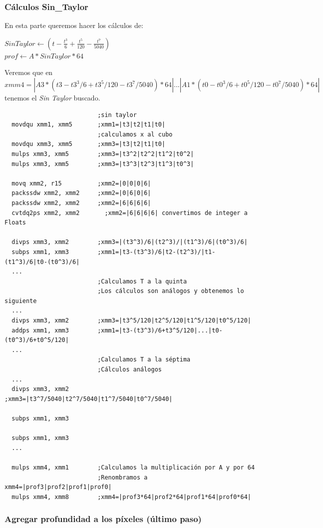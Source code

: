 \subsubsection*{Cálculos Sin_Taylor}
En esta parte queremos hacer los cálculos de:
\begin{center}
	$SinTaylor \gets (t - \frac{t^3}{6}+\frac{t^5}{120}-\frac{t^7}{5040})$ \\
	$prof \gets A * SinTaylor*64$
\end{center}
Veremos que en $xmm4=|A3*(t3-t3^3/6+t3^5/120-t3^7/5040)*64|...|A1*(t0-t0^3/6+t0^5/120-t0^7/5040)*64|$ tenemos el \textit{Sin Taylor} buscado.
\begin{codesnippet}
\begin{verbatim}
                          ;sin taylor
  movdqu xmm1, xmm5       ;xmm1=|t3|t2|t1|t0|
                          ;calculamos x al cubo
  movdqu xmm3, xmm5       ;xmm3=|t3|t2|t1|t0|
  mulps xmm3, xmm5        ;xmm3=|t3^2|t2^2|t1^2|t0^2|
  mulps xmm3, xmm5        ;xmm3=|t3^3|t2^3|t1^3|t0^3|	

  movq xmm2, r15          ;xmm2=|0|0|0|6|
  packssdw xmm2, xmm2     ;xmm2=|0|6|0|6|
  packssdw xmm2, xmm2     ;xmm2=|6|6|6|6|
  cvtdq2ps xmm2, xmm2	    ;xmm2=|6|6|6|6| convertimos de integer a Floats

  divps xmm3, xmm2        ;xmm3=|(t3^3)/6|(t2^3)/|(t1^3)/6|(t0^3)/6|
  subps xmm1, xmm3        ;xmm1=|t3-(t3^3)/6|t2-(t2^3)/|t1-(t1^3)/6|t0-(t0^3)/6|
  ...              
                          ;Calculamos T a la quinta
                          ;Los cálculos son análogos y obtenemos lo siguiente
  ...
  divps xmm3, xmm2        ;xmm3=|t3^5/120|t2^5/120|t1^5/120|t0^5/120|								
  addps xmm1, xmm3        ;xmm1=|t3-(t3^3)/6+t3^5/120|...|t0-(t0^3)/6+t0^5/120|								
  ...
                          ;Calculamos T a la séptima
                          ;Cálculos análogos
  ...
  divps xmm3, xmm2        ;xmm3=|t3^7/5040|t2^7/5040|t1^7/5040|t0^7/5040|
                  
  subps xmm1, xmm3        

  subps xmm1, xmm3        
  ...

  mulps xmm4, xmm1        ;Calculamos la multiplicación por A y por 64
                          ;Renombramos a xmm4=|prof3|prof2|prof1|prof0|		
  mulps xmm4, xmm8        ;xmm4=|prof3*64|prof2*64|prof1*64|prof0*64|

\end{verbatim}
\end{codesnippet}

\subsubsection*{Agregar profundidad a los píxeles (último paso)}

